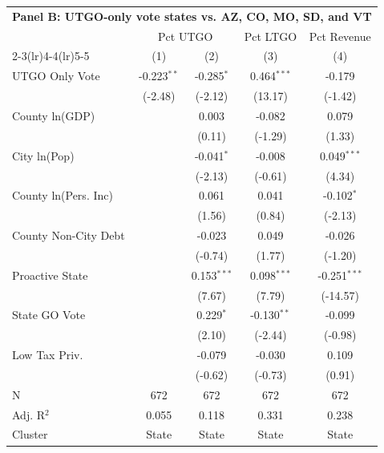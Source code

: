 \begingroup
\centering
\begin{tabular*}{\textwidth}{@{\extracolsep{\fill}}lcccc}
\multicolumn{5}{l}{\textbf{Panel B: UTGO-only vote states vs. AZ, CO, MO, SD, and VT}}\\

\addlinespace
   \toprule
    & \multicolumn{2}{c}{Pct UTGO} & Pct LTGO & Pct Revenue\\
   \cmidrule(lr){2-3}\cmidrule(lr){4-4}\cmidrule(lr){5-5}
                        & (1)           & (2)           & (3)           & (4)\\  
   \midrule 
   UTGO Only Vote       & -0.223$^{**}$ & -0.285$^{*}$  & 0.464$^{***}$ & -0.179\\   
                        & (-2.48)      & (-2.12)      & (13.17)      & (-1.42)\\   
   County ln(GDP)       &               & 0.003         & -0.082        & 0.079\\   
                        &               & (0.11)       & (-1.29)      & (1.33)\\   
   City ln(Pop)         &               & -0.041$^{*}$  & -0.008        & 0.049$^{***}$\\   
                        &               & (-2.13)      & (-0.61)      & (4.34)\\   
   County ln(Pers. Inc) &               & 0.061         & 0.041         & -0.102$^{*}$\\   
                        &               & (1.56)       & (0.84)       & (-2.13)\\   
   County Non-City Debt &               & -0.023        & 0.049         & -0.026\\   
                        &               & (-0.74)      & (1.77)       & (-1.20)\\   
   Proactive State      &               & 0.153$^{***}$ & 0.098$^{***}$ & -0.251$^{***}$\\   
                        &               & (7.67)       & (7.79)       & (-14.57)\\   
   State GO Vote        &               & 0.229$^{*}$   & -0.130$^{**}$ & -0.099\\   
                        &               & (2.10)       & (-2.44)      & (-0.98)\\   
   Low Tax Priv.        &               & -0.079        & -0.030        & 0.109\\   
                        &               & (-0.62)      & (-0.73)      & (0.91)\\   
   \hline
   N         & 672           & 672           & 672           & 672\\  
   Adj. R$^2$       & 0.055         & 0.118         & 0.331         & 0.238\\  
   Cluster              & State & State & State & State\\  
   \bottomrule
\end{tabular*}
\par\endgroup
